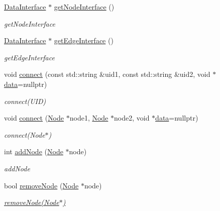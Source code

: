 \begin{DoxyCompactItemize}
\mbox{\hyperlink{struct_data_interface}{Data\+Interface}} $\ast$ \mbox{\hyperlink{class_graph_a9bda05ab33875f275e6a0e44862febf4}{get\+Node\+Interface}} ()
\begin{DoxyCompactList}\small\item\em get\+Node\+Interface \end{DoxyCompactList}\item 
\mbox{\hyperlink{struct_data_interface}{Data\+Interface}} $\ast$ \mbox{\hyperlink{class_graph_acd9d49e6e5767accd435a6446879e49b}{get\+Edge\+Interface}} ()
\begin{DoxyCompactList}\small\item\em get\+Edge\+Interface \end{DoxyCompactList}\item 
void \mbox{\hyperlink{class_graph_a6f487be56c6a426443caa718e33c5399}{connect}} (const std\+::string \&uid1, const std\+::string \&uid2, void $\ast$\mbox{\hyperlink{_graph_8h_a98cbe1f79429fc62806b32b6e8871d9e}{data}}=nullptr)
\begin{DoxyCompactList}\small\item\em connect(\+U\+I\+D) \end{DoxyCompactList}\item 
void \mbox{\hyperlink{class_graph_afedc0da07ed8ca06cf07f202dd83cec4}{connect}} (\mbox{\hyperlink{class_node}{Node}} $\ast$node1, \mbox{\hyperlink{class_node}{Node}} $\ast$node2, void $\ast$\mbox{\hyperlink{_graph_8h_a98cbe1f79429fc62806b32b6e8871d9e}{data}}=nullptr)
\begin{DoxyCompactList}\small\item\em connect(\+Node$\ast$) \end{DoxyCompactList}\item 
int \mbox{\hyperlink{class_graph_a8236fc82b90fdea9b07d4cd0ae189925}{add\+Node}} (\mbox{\hyperlink{class_node}{Node}} $\ast$node)
\begin{DoxyCompactList}\small\item\em add\+Node \end{DoxyCompactList}\item 
bool \mbox{\hyperlink{class_graph_a32b254ea9535f8f4ad831d129db525e8}{remove\+Node}} (\mbox{\hyperlink{class_node}{Node}} $\ast$node)
\begin{DoxyCompactList}\small\item\em \mbox{\hyperlink{class_graph_a32b254ea9535f8f4ad831d129db525e8}{remove\+Node(\+Node$\ast$)}} \end{DoxyCompactList}\item 

\end{DoxyCompactItemize}
